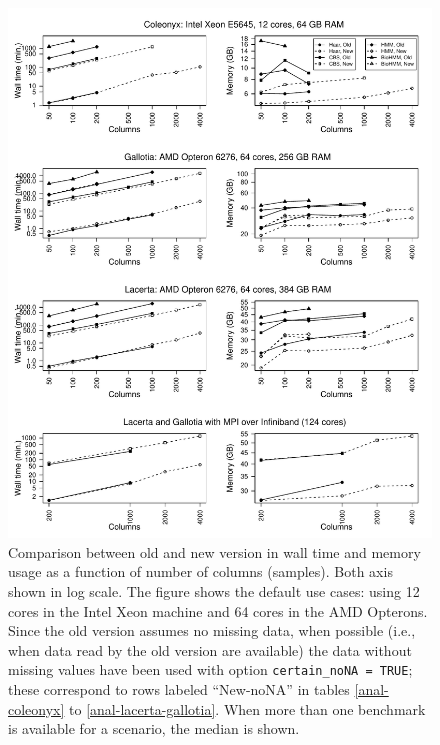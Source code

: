 \documentclass[a4paper,11pt]{article}
\begin{document}
\clearpage
\begin{figure}[h!]
\begin{center}
  \includegraphics[width=16.1cm,keepaspectratio]{anal-benchmark-fig.pdf}
\end{center}
\caption[Wall time and memory usage when analyzing data: version
comparison]{\label{fig-anal} Comparison between old and new version in
  wall time and memory usage as a function of number of columns
  (samples). Both axis shown in log scale. The figure shows the default
  use cases: using 12 cores in the Intel Xeon machine and 64 cores in the
  AMD Opterons. Since the old version assumes no missing data, when
  possible (i.e., when data read by the old version are available) the
  data without missing values have been used with option
  \texttt{certain\_noNA = TRUE}; these correspond to rows labeled
  ``New-noNA'' in tables \ref{anal-coleonyx} to
  \ref{anal-lacerta-gallotia}. When more than one benchmark is available
  for a scenario, the median is shown.}
\end{figure}
\end{document}
